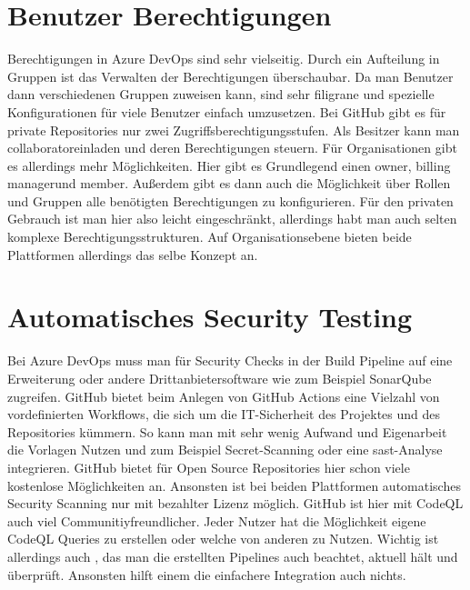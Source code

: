 \section{Benutzer Berechtigungen}
Berechtigungen in Azure DevOps sind sehr vielseitig. Durch ein Aufteilung in Gruppen ist das Verwalten der Berechtigungen überschaubar. Da man Benutzer dann verschiedenen Gruppen zuweisen kann, sind sehr filigrane und spezielle Konfigurationen für viele Benutzer einfach umzusetzen. \cite{KathrynEE_fd} Bei GitHub gibt es für private Repositories nur zwei Zugriffsberechtigungsstufen. Als Besitzer kann man \glqq collaborator\grqq\enspace einladen und deren Berechtigungen steuern. Für Organisationen gibt es allerdings mehr Möglichkeiten. Hier gibt es Grundlegend einen \glqq owner\grqq , \glqq billing manager\grqq\enspace und \glqq member\grqq. Außerdem gibt es dann auch die Möglichkeit über Rollen und Gruppen alle benötigten Berechtigungen zu konfigurieren. \cite{github-permissions} Für den privaten Gebrauch ist man hier also leicht eingeschränkt, allerdings habt man auch selten komplexe Berechtigungsstrukturen. Auf Organisationsebene bieten beide Plattformen allerdings das selbe Konzept an.

\section{Automatisches Security Testing}
Bei Azure DevOps muss man für Security Checks in der Build Pipeline auf eine Erweiterung oder andere Drittanbietersoftware wie zum Beispiel SonarQube zugreifen. GitHub bietet beim Anlegen von GitHub Actions eine Vielzahl von vordefinierten Workflows, die sich um die IT-Sicherheit des Projektes und des Repositories kümmern. So kann man mit sehr wenig Aufwand und Eigenarbeit die Vorlagen Nutzen und zum Beispiel Secret-Scanning oder eine \ac{sast}-Analyse integrieren. GitHub bietet für Open Source Repositories hier schon viele kostenlose Möglichkeiten an. Ansonsten ist bei beiden Plattformen automatisches Security Scanning nur mit bezahlter Lizenz möglich. GitHub ist hier mit CodeQL auch viel Communitiyfreundlicher. Jeder Nutzer hat die Möglichkeit eigene CodeQL Queries zu erstellen oder welche von anderen zu Nutzen. \cite{Porta2021-vz} Wichtig ist allerdings auch , das man die erstellten Pipelines auch beachtet, aktuell hält und überprüft. Ansonsten hilft einem die einfachere Integration auch nichts.


